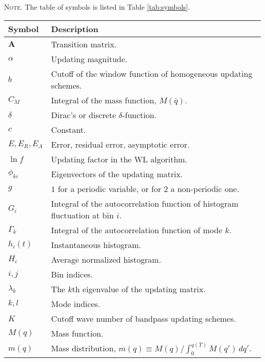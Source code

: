 \documentclass[preprint, superscriptaddress, floatfix]{revtex4-1}
\newcommand{\note}[1]{{\color{DarkGreen}\footnotesize \textsc{Note.} #1}}
\newcommand{\Err}{E}
\begin{document}
\note{The table of symbols is listed in Table \ref{tab:symbols}.
  \begin{table*}
  \footnotesize
  \centering
  \rowcolors{1}{white}{LightGray}
  \setlength{\tabcolsep}{4pt} %
  \caption{\label{tab:symbols}
    Table of symbols.}
  \begin{tabular}{l | p{12cm} }
    Symbol          &   Description \\
    \hline
    $\mathbf{A}$    &   Transition matrix. \\
    $\alpha$        &   Updating magnitude. \\
    $b$             &   Cutoff of the window function of homogeneous updating schemes. \\
    $C_M$           &   Integral of the mass function, $M(\bar q)$.  \\
    $\delta$        &   Dirac's or discrete $\delta$-function. \\
    $c$             &   Constant. \\
    $\Err, \Err_R, \Err_A$          &   Error, residual error, asymptotic error. \\
    $\ln f$         &   Updating factor in the WL algorithm.  \\
    $\phi_{ki}$     &   Eigenvectors of the updating matrix. \\
    $g$             &   $1$ for a periodic variable, or for $2$ a non-periodic one. \\
    $G_i$           &   Integral of the autocorrelation function of histogram fluctuation at bin $i$. \\
    $\Gamma_k$      &   Integral of the autocorrelation function of mode $k$. \\
    $h_i(t)$        &   Instantaneous histogram.  \\
    $H_i$           &   Average normalized histogram.  \\
    $i, j$          &   Bin indices. \\
    $\lambda_k$     &   The $k$th eigenvalue of the updating matrix. \\
    $k, l$          &   Mode indices. \\
    $K$             &   Cutoff wave number of bandpass updating schemes.  \\
    $M(q)$          &   Mass function.   \\
    $m(q)$          &   Mass distribution,
                        $m(q) \equiv M(q)/\int_0^{ q(T) } M(q') \, dq'$.  \\

\end{tabular}
\end{table*}}
\end{document}
